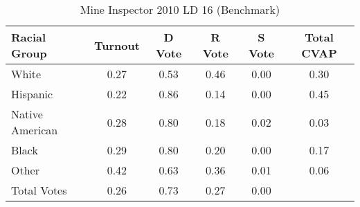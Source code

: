 \begin{table}[htb]
\begin{center}
\caption{Mine Inspector 2010 LD 16 (Benchmark)}
\label{smine_cvap_ld_16_benchmark}
\begin{tabular}{lccccc}
  \hline
Racial Group & Turnout & D Vote & R Vote & S Vote & Total CVAP \\ 
  \hline
White & 0.27 & 0.53 & 0.46 & 0.00 & 0.30 \\ 
  Hispanic & 0.22 & 0.86 & 0.14 & 0.00 & 0.45 \\ 
  Native American & 0.28 & 0.80 & 0.18 & 0.02 & 0.03 \\ 
  Black & 0.29 & 0.80 & 0.20 & 0.00 & 0.17 \\ 
  Other & 0.42 & 0.63 & 0.36 & 0.01 & 0.06 \\ 
  Total Votes & 0.26 & 0.73 & 0.27 & 0.00 &  \\ 
   \hline
\end{tabular}
\end{center}
\end{table}
